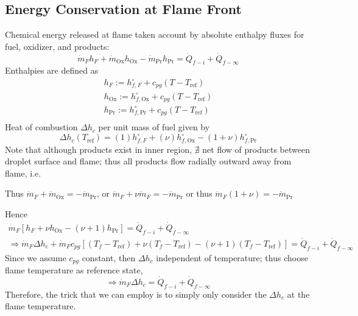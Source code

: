 \documentclass[10pt]{amsart}
\begin{document}
\begin{multicols*}{2}
\subsection{Energy Conservation at Flame Front}

Chemical energy released at flame taken account by absolute enthalpy fluxes for fuel, oxidizer, and products:
\[
\dot{m}_F h_F + \dot{m}_{\text{Ox}} h_{\text{Ox}} - \dot{m}_{\text{Pr}} h_{\text{Pr}} = \dot{Q}_{f-i} + \dot{Q}_{f-\infty}
\]
Enthalpies are defined as
\[
\begin{aligned}
  h_F := h^{\circ}_{f,F} + c_{pg} (T-T_{\text{ref}}) \\ 
  h_{\text{Ox}} := h^{\circ}_{f,\text{Ox}} + c_{pg} (T-T_{\text{ref}}) \\ 
  h_{\text{Pr}} := h^{\circ}_{f,\text{Pr}} + c_{pg} (T-T_{\text{ref}}) \\ 
\end{aligned}
\]
Heat of combustion $\Delta h_c$ per unit mass of fuel given by
\[
\Delta h_c(T_{\text{ref}}) = (1) h_{f,F}^{\circ} + (\nu) h_{f,\text{Ox}}^{\circ} - (1+\nu) h^{\circ}_{f,\text{Pr}}
\]
Note that although products exist in inner region, $\nexists$ net flow of products between droplet surface and flame; thus all products flow radially outward away from flame, i.e.

Thus $\dot{m}_F + \dot{m}_{\text{Ox}} = -\dot{m}_{\text{Pr}}$, or $\dot{m}_F + \nu \dot{m}_F = -\dot{m}_{\text{Pr}}$ or thus $\dot{m}_F(1+\nu) = -\dot{m}_{\text{Pr}}$

Hence
\[
\begin{gathered}
\dot{m}_F [ h_F + \nu h_{\text{Ox}} - (\nu + 1) h_{\text{Pr}} ] = \dot{Q}_{f-i} + \dot{Q}_{f-\infty} \\
\Longrightarrow \dot{m}_F \Delta h_c + \dot{m}_F c_{pg} [ (T_f - T_{\text{ref}} ) + \nu (T_f - T_{\text{ref}} ) - (\nu + 1) (T_f - T_{\text{ref}} ) ] = \dot{Q}_{f-i} + \dot{Q}_{f-\infty}
\end{gathered}
\]
Since we assume $c_{pg}$ constant, then $\Delta h_c $ independent of temperature; thus choose flame temperature as reference state,
\[
\Longrightarrow \dot{m}_F \Delta h_c = \dot{Q}_{f-i} + \dot{Q}_{f-\infty}
\]
Therefore, the trick that we can employ is to simply only consider the $\Delta h_c$ at the flame temperature.  



\end{multicols*}
\end{document}
